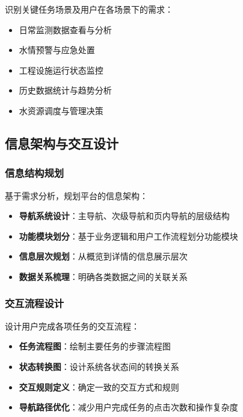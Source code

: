 识别关键任务场景及用户在各场景下的需求：

\begin{itemize}
\tightlist
\item
  日常监测数据查看与分析
\item
  水情预警与应急处置
\item
  工程设施运行状态监控
\item
  历史数据统计与趋势分析
\item
  水资源调度与管理决策
\end{itemize}

\subsection{信息架构与交互设计}\label{ux4fe1ux606fux67b6ux6784ux4e0eux4ea4ux4e92ux8bbeux8ba1}

\subsubsection{信息结构规划}\label{ux4fe1ux606fux7ed3ux6784ux89c4ux5212}

基于需求分析，规划平台的信息架构：

\begin{itemize}
\tightlist
\item
  \textbf{导航系统设计}：主导航、次级导航和页内导航的层级结构
\item
  \textbf{功能模块划分}：基于业务逻辑和用户工作流程划分功能模块
\item
  \textbf{信息层次规划}：从概览到详情的信息展示层次
\item
  \textbf{数据关系梳理}：明确各类数据之间的关联关系
\end{itemize}

\subsubsection{交互流程设计}\label{ux4ea4ux4e92ux6d41ux7a0bux8bbeux8ba1}

设计用户完成各项任务的交互流程：

\begin{itemize}
\tightlist
\item
  \textbf{任务流程图}：绘制主要任务的步骤流程图
\item
  \textbf{状态转换图}：设计系统各状态间的转换关系
\item
  \textbf{交互规则定义}：确定一致的交互方式和规则
\item
  \textbf{导航路径优化}：减少用户完成任务的点击次数和操作复杂度
\end{itemize}

